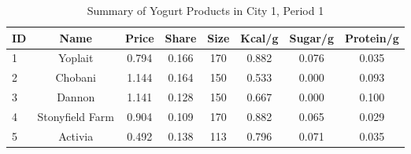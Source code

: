 \begin{table}[htbp]
\centering
\begin{tabular}{lccccccc}
\toprule
ID & Name & Price & Share & Size & Kcal/g & Sugar/g & Protein/g \\
\midrule
1 & Yoplait & 0.794 & 0.166 & 170 & 0.882 & 0.076 & 0.035 \\
2 & Chobani & 1.144 & 0.164 & 150 & 0.533 & 0.000 & 0.093 \\
3 & Dannon & 1.141 & 0.128 & 150 & 0.667 & 0.000 & 0.100 \\
4 & Stonyfield Farm & 0.904 & 0.109 & 170 & 0.882 & 0.065 & 0.029 \\
5 & Activia & 0.492 & 0.138 & 113 & 0.796 & 0.071 & 0.035 \\
\bottomrule
\end{tabular}

\caption{Summary of Yogurt Products in City 1, Period 1}
\label{tab:yoghurt_summary}
\end{table}
